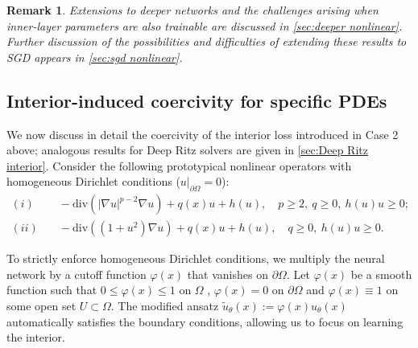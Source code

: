 \documentclass{article}
\newtheorem{remark}{Remark}
\begin{document}
\begin{remark}
Extensions to deeper networks and the challenges arising when inner-layer parameters are also trainable are discussed in \cref{sec:deeper nonlinear}. 
Further discussion of the possibilities and difficulties of extending these results to SGD appears in \cref{sec:sgd nonlinear}.
\end{remark}

\subsection{Interior-induced coercivity for specific PDEs}\label{sec:interior coercivity}
We now discuss in detail the coercivity of the interior loss introduced in Case 2 above; analogous results for Deep Ritz solvers are given in \cref{sec:Deep Ritz interior}.
Consider the following prototypical nonlinear operators with homogeneous Dirichlet conditions ($u|_{\partial\Omega}=0$):
\begin{equation}
\begin{aligned}
(i) &\quad -\text{div}(|\nabla u|^{p-2}\nabla u) + q(x)u + h(u), \quad p\geq 2,\ q\geq 0,\ h(u)u\geq 0; \\
(ii) &\quad -\text{div}((1+u^2)\nabla u) + q(x)u + h(u), \quad q\geq 0,\ h(u)u\geq 0. \label{eq:special PDE}
\end{aligned}
\end{equation}

To strictly enforce homogeneous Dirichlet conditions, we multiply the neural network by a cutoff function $\varphi(x)$ that vanishes on $\partial\Omega$. 
Let $\varphi(x)$ be a smooth function such that $0\le\varphi(x)\le 1$ on $\Omega$ , $\varphi(x)=0$ on $\partial\Omega$ and $\varphi(x)\equiv 1$ on some open set $U\subset \Omega$.
The modified ansatz $\tilde{u}_{\theta}(x):=\varphi(x)u_{\theta}(x)$ automatically satisfies the boundary conditions, allowing us to focus on learning the interior. %
\end{document}
